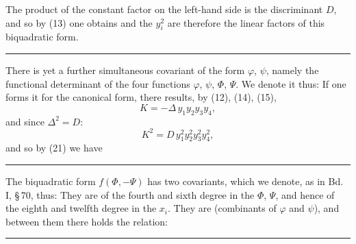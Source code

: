 
The product of the constant factor on the left-hand side is the
discriminant $D$, and so by (13) one obtains
and the $y_i^2$ are therefore the linear factors of this biquadratic
form.

\begin{center}
\rule{2cm}{0.4pt}
\end{center}

There is yet a further simultaneous covariant of the form $\varphi$,
$\psi$, namely the  functional determinant of the four
functions $\varphi$, $\psi$, $\Phi$, $\Psi$. We denote it thus:
If one forms it for the canonical form, there results, by (12),
(14), (15),
\[
K = -\Delta\,y_1y_2y_3y_4,
\]
and since $\Delta^2 = D$:
\[
K^2 = D\,y_1^2y_2^2y_3^2y_4^2,
\]
and so by (21) we have

\begin{center}
\rule{2cm}{0.4pt}
\end{center}

The biquadratic form $f(\Phi, -\Psi)$ has two covariants, which we
denote, as in Bd. I, §\,70, thus:
They are of the fourth and sixth degree in the $\Phi$, $\Psi$, and
hence of the eighth and twelfth degree in the $x_i$. They are
 (combinants of $\varphi$ and
$\psi$), and between them there holds the relation:

\begin{center}
\rule{2cm}{0.4pt}
\end{center}
